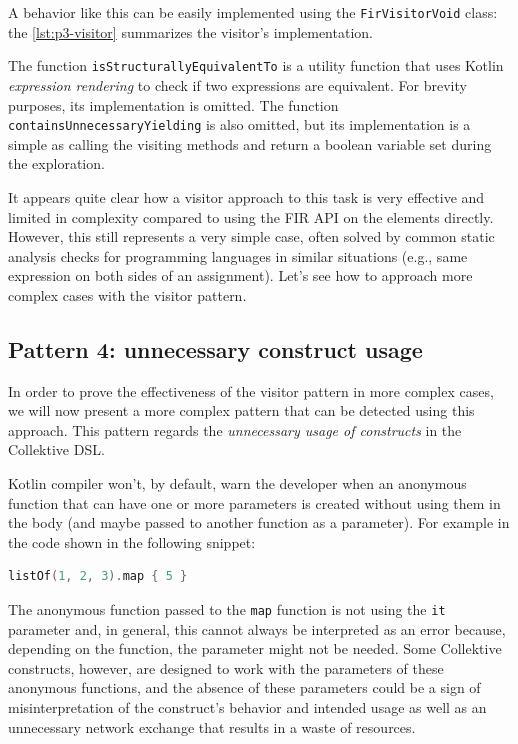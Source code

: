 \documentclass[12pt,a4paper,openright,twoside]{book}
\begin{document}
A behavior like this can be easily implemented using the
\lstinline{FirVisitorVoid} class: the \cref{lst:p3-visitor} summarizes the visitor's
implementation.



The function \lstinline{isStructurallyEquivalentTo} is a utility function that
uses Kotlin \emph{expression rendering} to check if two expressions are 
equivalent. For brevity purposes, its implementation is omitted.
%
The function \lstinline{containsUnnecessaryYielding} is also omitted, but its
implementation is a simple as calling the visiting methods and return a boolean
variable set during the exploration.

It appears quite clear how a visitor approach to this task is very effective and
limited in complexity compared to using the \ac{FIR} API on the elements
directly. However, this still represents a very simple case, often solved by
common static analysis checks for programming languages in similar situations
(e.g., same expression on both sides of an assignment). Let's see how to 
approach more complex cases with the visitor pattern.

\subsection{Pattern 4: unnecessary construct usage}

In order to prove the effectiveness of the visitor pattern in more complex cases,
we will now present a more complex pattern that can be detected using this
approach. This pattern regards the \emph{unnecessary usage of constructs} in the
Collektive DSL.

Kotlin compiler won't, by default, warn the developer when an anonymous function
that can have one or more parameters is created without using them in the body 
(and maybe passed to another function as a parameter). For example in the code
shown in the following snippet:

\begin{lstlisting}[language=Kotlin]
listOf(1, 2, 3).map { 5 }
\end{lstlisting}

The anonymous function passed to the \lstinline{map} function is not using the
\lstinline{it} parameter and, in general, this cannot always be interpreted as
an error because, depending on the function, the parameter might not be needed.
%
Some Collektive constructs, however, are designed to work with the parameters of
these anonymous functions, and the absence of these parameters could be a sign
of misinterpretation of the construct's behavior and intended usage as well as 
an unnecessary network exchange that results in a waste of resources.
\end{document}
